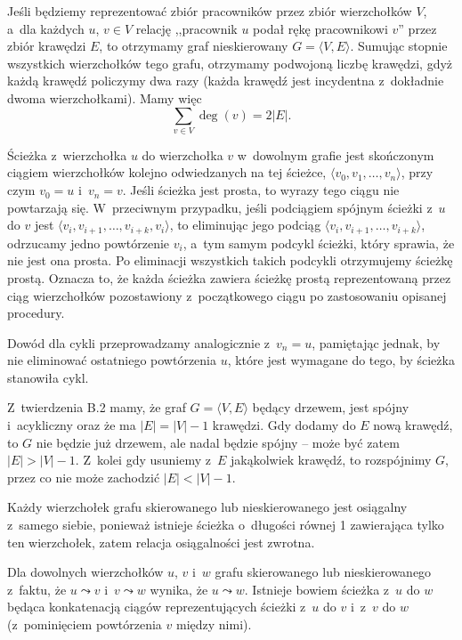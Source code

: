 
\exercise %
Jeśli będziemy reprezentować zbiór pracowników przez zbiór wierzchołków $V$, a~dla każdych $u$, $v\in V$ relację ,,pracownik $u$ podał rękę pracownikowi $v$'' przez zbiór krawędzi $E$, to otrzymamy graf nieskierowany $G=\langle V,E\rangle$.
Sumując stopnie wszystkich wierzchołków tego grafu, otrzymamy podwojoną liczbę krawędzi, gdyż każdą krawędź policzymy dwa razy (każda krawędź jest incydentna z~dokładnie dwoma wierzchołkami).
Mamy więc
\[
	\sum_{v\in V}\deg(v) = 2|E|.
\]

\exercise %
Ścieżka z~wierzchołka $u$ do wierzchołka $v$ w~dowolnym grafie jest skończonym ciągiem wierzchołków kolejno odwiedzanych na tej ścieżce, $\langle v_0,v_1,\dots,v_n\rangle$, przy czym $v_0=u$ i~$v_n=v$.
Jeśli ścieżka jest prosta, to wyrazy tego ciągu nie powtarzają się.
W~przeciwnym przypadku, jeśli podciągiem spójnym ścieżki z~$u$ do $v$ jest $\langle v_i,v_{i+1},\dots,v_{i+k},v_i\rangle$, to eliminując jego podciąg $\langle v_i,v_{i+1},\dots,v_{i+k}\rangle$, odrzucamy jedno powtórzenie $v_i$, a~tym samym podcykl ścieżki, który sprawia, że nie jest ona prosta.
Po eliminacji wszystkich takich podcykli otrzymujemy ścieżkę prostą.
Oznacza to, że każda ścieżka zawiera ścieżkę prostą reprezentowaną przez ciąg wierzchołków pozostawiony z~początkowego ciągu po zastosowaniu opisanej procedury.

Dowód dla cykli przeprowadzamy analogicznie z~$v_n=u$, pamiętając jednak, by nie eliminować ostatniego powtórzenia $u$, które jest wymagane do tego, by ścieżka stanowiła cykl.

\exercise %
Z~twierdzenia B.2 mamy, że graf $G=\langle V,E\rangle$ będący drzewem, jest spójny i~acykliczny oraz że ma $|E|=|V|-1$ krawędzi.
Gdy dodamy do $E$ nową krawędź, to $G$ nie będzie już drzewem, ale nadal będzie spójny -- może być zatem $|E|>|V|-1$.
Z~kolei gdy usuniemy z~$E$ jakąkolwiek krawędź, to rozspójnimy $G$, przez co nie może zachodzić $|E|<|V|-1$.

\exercise %
Każdy wierzchołek grafu skierowanego lub nieskierowanego jest osiągalny z~samego siebie, ponieważ istnieje ścieżka o~długości równej 1 zawierająca tylko ten wierzchołek, zatem relacja osiągalności jest zwrotna.

Dla dowolnych wierzchołków $u$, $v$ i~$w$ grafu skierowanego lub nieskierowanego z~faktu, że $u\leadsto v$ i~$v\leadsto w$ wynika, że $u\leadsto w$.
Istnieje bowiem ścieżka z~$u$ do $w$ będąca konkatenacją ciągów reprezentujących ścieżki z~$u$ do $v$ i~z~$v$ do $w$ (z~pominięciem powtórzenia $v$ między nimi).

